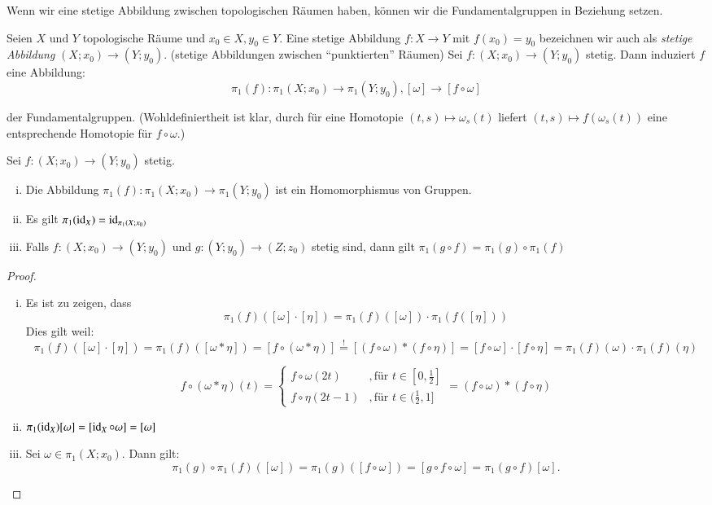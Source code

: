 \documentclass[a4paper,10pt]{scrartcl}
\begin{document}
Wenn wir eine stetige Abbildung zwischen topologischen Räumen haben, können wir die Fundamentalgruppen in Beziehung setzen.
\begin{df}
 Seien $X$ und $Y$ topologische Räume und $x_0\in X, y_0 \in Y$. Eine stetige Abbildung $f: X\to Y$ mit $f(x_0)=y_0$ bezeichnen wir auch als \emph{stetige Abbildung} $(X;x_0)\to (Y;y_0)$. (stetige Abbildungen zwischen "`punktierten"' Räumen) Sei $f: (X;x_0) \to (Y;y_0)$ stetig.  Dann induziert $f$ eine Abbildung:
\[
 \pi_1 (f) : \pi_1(X;x_0)\to \pi_1(Y;y_0), [\omega] \to [f \circ \omega]
\]
\begin{figure}[ht]
\centering

\end{figure}
der Fundamentalgruppen. (Wohldefiniertheit ist klar, durch für eine Homotopie $(t,s)\mapsto \omega_s(t)$ liefert $(t,s) \mapsto f(\omega_s(t))$ eine entsprechende Homotopie für $f\circ \omega$.)
\end{df}
\begin{st}
 Sei $f: (X;x_0)\to (Y;y_0)$ stetig.
\begin{enumerate}[(i)]
 \item Die Abbildung $\pi_1(f): \pi_1(X;x_0) \to \pi_1(Y;y_0)$ ist ein Homomorphismus von Gruppen.
 \item Es gilt $\pi_1(\operatorname{id}_X)=\operatorname{id}_{\pi_1(X; x_0)}$
 \item Falls $f:(X;x_0) \to (Y;y_0)$ und $g: (Y; y_0) \to (Z; z_0)$ stetig sind, dann gilt $\pi_1(g\circ f)=\pi_1(g)\circ \pi_1(f)$
\end{enumerate}
\end{st}
\begin{proof}
\begin{enumerate}[(i)]
\item Es ist zu zeigen, dass
\[
 \pi_1(f)([\omega]\cdot [\eta])=\pi_1(f)([\omega])\cdot \pi_1(f([\eta]))
\]
Dies gilt weil: 
$$
\pi_1(f)([\omega]\cdot [\eta])=\pi_1(f)([\omega*\eta])= [f\circ (\omega*\eta)] \stackrel ! = [(f\circ \omega)*(f\circ \eta)]=[f\circ \omega] \cdot [f\circ \eta]=\pi_1(f)(\omega)\cdot \pi_1(f)(\eta)
$$

\[
 f\circ(\omega*\eta)(t)=\begin{cases} f\circ \omega (2t) &, \text{für } t\in[0,\frac{1}{2}]\\  f\circ \eta (2t - 1) &, \text{für } t\in(\frac{1}{2},1]\end{cases} = (f \circ \omega) * (f \circ \eta)
\]
\item $\pi_1(\operatorname{id}_X)[\omega]=[\operatorname{id}_X\circ \omega]=[\omega]$
\item Sei $\omega\in \pi_1(X;x_0)$. Dann gilt:
\[
 \pi_1(g)\circ \pi_1(f)([\omega])=\pi_1(g)([f\circ \omega])=[g\circ f \circ \omega]=\pi_1(g\circ f) [\omega].
\]
\end{enumerate}
\end{proof}
\end{document}
